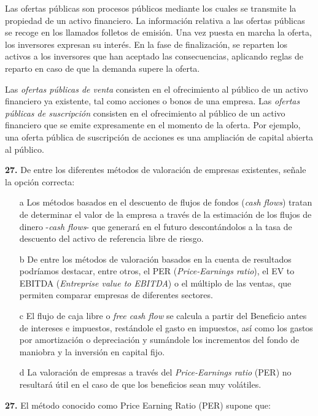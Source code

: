 \documentclass{nuevotema}
\begin{document}
Las ofertas públicas son procesos públicos mediante los cuales se transmite la propiedad de un activo financiero. La información relativa a las ofertas públicas se recoge en los llamados folletos de emisión. Una vez puesta en marcha la oferta, los inversores expresan su interés. En la fase de finalización, se reparten los activos a los inversores que han aceptado las consecuencias, aplicando reglas de reparto en caso de que la demanda supere la oferta.
 
Las \textit{ofertas públicas de venta} consisten en el ofrecimiento al público de un activo financiero ya existente, tal como acciones o bonos de una empresa. Las \textit{ofertas públicas de suscripción} consisten en el ofrecimiento al público de un activo financiero que se emite expresamente en el momento de la oferta. Por ejemplo, una oferta pública de suscripción de acciones es una ampliación de capital abierta al público. 

\preguntas


\textbf{27.} De entre los diferentes métodos de valoración de empresas existentes, señale la opción correcta:

\begin{itemize}
	\item[a] Los métodos basados en el descuento de flujos de fondos (\textit{cash flows}) tratan de determinar el valor de la empresa a través de la estimación de los flujos de dinero -\textit{cash flows}- que generará en el futuro descontándolos a la tasa de descuento del activo de referencia libre de riesgo.
	\item[b] De entre los métodos de valoración basados en la cuenta de resultados podríamos destacar, entre otros, el PER (\textit{Price-Earnings ratio}), el EV to EBITDA (\textit{Entreprise value to EBITDA}) o el múltiplo de las ventas, que permiten comparar empresas de diferentes sectores.
	\item[c] El flujo de caja libre o \textit{free cash flow} se calcula a partir del Beneficio antes de intereses e impuestos, restándole el gasto en impuestos, así como los gastos por amortización o depreciación y sumándole los incrementos del fondo de maniobra y la inversión en capital fijo.
	\item[d] La valoración de empresas a través del \textit{Price-Earnings ratio} (PER) no resultará útil en el caso de que los beneficios sean muy volátiles.
\end{itemize}

\textbf{27.} El método conocido como Price Earning Ratio (PER) supone que:
\end{document}
